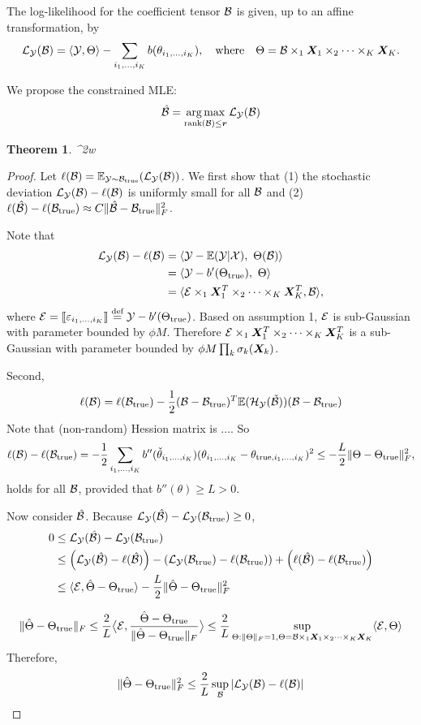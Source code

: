 \documentclass[11pt]{article}
\theoremstyle{plain}
\newtheorem{thm}{Theorem}
\theoremstyle{definition}
\begin{document}
The log-likelihood for the coefficient tensor $\mathcal{B}$ is given, up to an affine transformation, by
\[
\mathcal{L}_{\mathcal{Y}}(\mathcal{B})=\langle \mathcal{Y}, \Theta \rangle - \sum_{i_1,\ldots,i_K}b(\theta_{i_1,\ldots,i_K}),\quad \text{where}\quad \Theta=\mathcal{B}\times_1\bm X_1\times_2\cdots\times_K \bm X_K.
\]

We propose the constrained MLE:
\[
\hat {\mathcal{B}}=\operatorname*{arg\,max}_{\text{rank}(\mathcal{B})\leq \bm{r}} \mathcal{L}_{\mathcal{Y}}(\mathcal{B})
\]

\begin{thm}
\FnormSize{}{\hat \tB-\tB}^2\leq w
\end{thm}

\begin{proof}
Let $\ell(\mathcal{B})=\mathbb{E}_{\mathcal{Y}\sim \mathcal{\mathcal{B}}_{\text{true}}}(\mathcal{L}_{\mathcal{Y}}(\mathcal{B}))$. We first show that (1) the stochastic deviation $\mathcal{L}_{\mathcal{Y}}(\mathcal{B})-\ell(\mathcal{B})$ is uniformly small for all $\mathcal{B}$ and (2) $\ell(\hat {\mathcal{B}}) - \ell(\mathcal{\mathcal{B}}_{\text{true}}) \approx C\lVert\hat {\mathcal{B}}-\mathcal{\mathcal{B}}_{\text{true}}\rVert_F^2$.


Note that 
\begin{align}
\mathcal{L}_{\mathcal{Y}}(\mathcal{B})-\ell(\mathcal{B})&=\langle \mathcal{Y}-\mathbb{E}(\mathcal{Y}|\mathcal{X}),\ \Theta(\mathcal{B})\rangle\\
&= \langle \mathcal{Y}- b'(\Theta_{\text{true}}),\ \Theta\rangle \\
&= \langle \mathcal{E}\times_1\bm X^T_1\times_2\cdots\times_K\bm X^T_K, \mathcal{B}\rangle,
\end{align}
where $\mathcal{E}=\llbracket \varepsilon_{i_1,\ldots,i_K} \rrbracket\stackrel{\text{def}}{=}\mathcal{Y}-b'(\Theta_{\text{true}})$. Based on assumption 1, $\mathcal{E}$ is sub-Gaussian with parameter bounded by $\phi M$. Therefore $\mathcal{E}\times_1\bm X^T_1\times_2\cdots\times_K\bm X^T_K$ is a sub-Gaussian with parameter bounded by $\phi M \prod_k \sigma_k(\bm X_k)$.

Second, 
\[
\ell(\mathcal{B})=\ell(\mathcal{\mathcal{B}}_{\text{true}})-{1\over 2}(\mathcal{B}-\mathcal{\mathcal{B}}_{\text{true}})^T\mathbb{E}(\mathcal{H}_{\mathcal{Y}}(\check {\mathcal{B}}))(\mathcal{B}-\mathcal{\mathcal{B}}_{\text{true}})
\]
Note that (non-random) Hession matrix is .... So
\[
\ell(\mathcal{B})-\ell(\mathcal{\mathcal{B}}_{\text{true}})=-{1\over 2}\sum_{i_1,\ldots,i_K}b''(\check \theta_{i_1,\ldots,i_K}) (\theta_{i_1,\ldots,i_K}-\theta_{\text{true},i_1,\ldots,i_K})^2 \leq -{L \over 2}\lVert\Theta-\Theta_{\text{true}}\rVert_F^2,
\]
holds for all $\mathcal{B}$, provided that $b''(\theta)\geq L>0$.

Now consider $\hat {\mathcal{B}}$. Because $\mathcal{L}_{\mathcal{Y}}(\hat {\mathcal{B}})- \mathcal{L}_{\mathcal{Y}}(\mathcal{\mathcal{B}}_{\text{true}})\geq 0$, 
\begin{align}
0&\leq \mathcal{L}_{\mathcal{Y}}(\hat {\mathcal{B}})- \mathcal{L}_{\mathcal{Y}}(\mathcal{\mathcal{B}}_{\text{true}}) \\
&\leq \left(\mathcal{L}_{\mathcal{Y}}(\hat {\mathcal{B}})-\ell(\hat {\mathcal{B}})\right)-\left( \mathcal{L}_{\mathcal{Y}}(\mathcal{\mathcal{B}}_{\text{true}})-\ell(\mathcal{\mathcal{B}}_{\text{true}})\right)+\left(\ell(\hat {\mathcal{B}})-\ell(\mathcal{\mathcal{B}}_{\text{true}})\right)\\
&\leq \langle \mathcal{E}, \hat \Theta-\Theta_{\text{true}} \rangle -{L\over 2}\lVert\hat \Theta-\Theta_{\text{true}}\rVert_F^2
\end{align}

\[
\lVert\hat \Theta-\Theta_{\text{true}}\rVert_F\leq {2\over L}\big\langle \mathcal{E}, {\hat \Theta -\Theta_{\text{true}} \over \lVert\hat \Theta-\Theta_{\text{true}}\rVert_F} \big\rangle\leq {2\over L}\sup_{\Theta: \lVert\Theta\rVert_F=1, \Theta=\mathcal{B}\times_1\bm X_1\times_2\cdots\times_K \bm X_K}\langle \mathcal{E}, \Theta \rangle
\]
Therefore, 
\[
\lVert\hat \Theta-\Theta_{\text{true}}\rVert_F^2\leq {2\over L}\sup_{\mathcal{B}}|\mathcal{L}_{\mathcal{Y}}(\mathcal{B})-\ell(\mathcal{B})|
\]
\end{proof}
\end{document}
